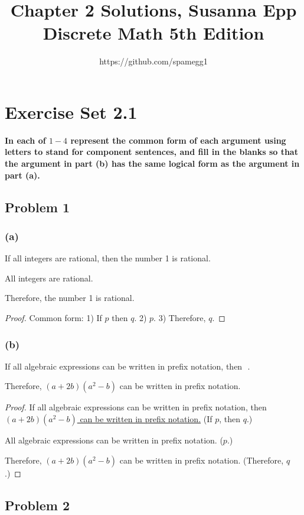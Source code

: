 \documentclass[14pt]{extarticle}
\title{Chapter 2 Solutions, Susanna Epp Discrete Math 5th Edition}
\author{https://github.com/spamegg1}
\newcommand{\fbl}{\underline{\hspace{1cm}}\,\,}
\begin{document}
\maketitle
\tableofcontents

\section {Exercise Set 2.1}
{\bf In each of $1-4$ represent the common form of each argument using letters
to stand for component sentences, and fill in the blanks so that the argument in
part (b) has the same logical form as the argument in part (a).}

\subsection{Problem 1}
\subsubsection{(a)}
If all integers are rational, then the number 1 is rational.

All integers are rational.

Therefore, the number 1 is rational.

\begin{proof}
Common form: 1) If $p$ then $q$. 2) $p$. 3) Therefore, $q$.
\end{proof}

\subsubsection{(b)}
If all algebraic expressions can be written in prefix notation, then \fbl.

Therefore, $(a + 2b)(a^2 - b)$ can be written in prefix notation.

\begin{proof}
If all algebraic expressions can be written in prefix notation, then \\
\underline{$(a + 2b)(a^2 - b)$ can be written in prefix notation.} (If $p$, then
$q$.)

All algebraic expressions can be written in prefix notation. ($p$.)

Therefore, $(a + 2b)(a^2 - b)$ can be written in prefix notation. (Therefore,
$q$.)
\end{proof}

\subsection{Problem 2}
\end{document}
